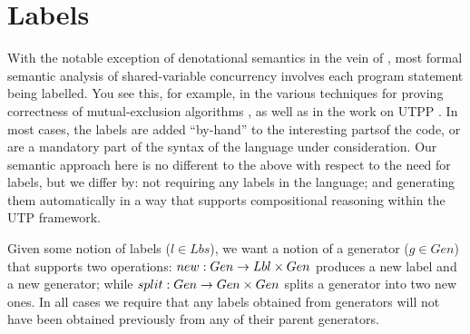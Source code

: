 \section{Labels}\label{sec:labels}

With the notable exception of denotational semantics
in the vein of \cite{DBLP:conf/lics/Brooks93},
most formal semantic analysis of shared-variable concurrency
involves each program statement being labelled.
You see this, for example, in the various techniques for proving correctness
of mutual-exclusion algorithms \cite{MUTEXPROOFS},
as well as in the work on UTPP \cite{DBLP:conf/icfem/WoodcockH02}.
In most cases, the labels are added ``by-hand''
to the interesting partsof the code,
or are a mandatory part of the syntax of the language under consideration.
Our semantic approach here is no different to the above with respect to
the need for labels,
but we differ by:
not requiring any labels in the language;
and generating them automatically
in a way that supports compositional reasoning within the UTP framework.

Given some notion of labels ($l \in Lbs$),
we want a notion of a generator ($g \in Gen$) that supports two operations:
$new:Gen \rightarrow Lbl \times Gen$ produces a new label and a new generator;
while
$split:Gen \rightarrow Gen \times Gen$ splits a generator into two new ones.
In all cases we require that any labels obtained from generators
will not have been obtained previously from any of their parent generators.

